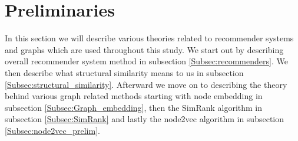 \section{Preliminaries}\label{Sec:preliminaries}
In this section we will describe various theories related to recommender systems and graphs which are used throughout this study. We start out by describing overall recommender system method in subsection \ref{Subsec:recommenders}. We then describe what structural similarity means to us in subsection \ref{Subsec:structural_similarity}. Afterward we move on to describing the theory behind various graph related methods starting with node embedding in subsection \ref{Subsec:Graph_embedding}, then the SimRank algorithm in subsection \ref{Subsec:SimRank} and lastly the node2vec algorithm in subsection \ref{Subsec:node2vec_prelim}.








